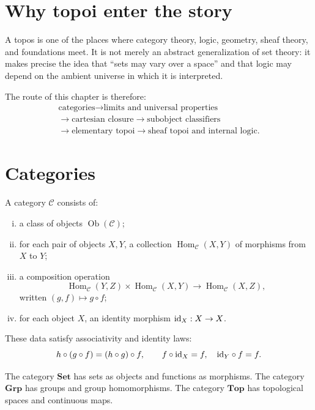
\section{Why topoi enter the story}

A topos is one of the places where category theory, logic, geometry, sheaf theory, and foundations meet.  It is not merely an abstract generalization of set theory: it makes precise the idea that ``sets may vary over a space'' and that logic may depend on the ambient universe in which it is interpreted.

The route of this chapter is therefore:
\[
\begin{gathered}
  \text{categories}\to \text{limits and universal properties}\\
  \to \text{cartesian closure}\to \text{subobject classifiers}\\
  \to \text{elementary topoi}\to \text{sheaf topoi and internal logic}.
\end{gathered}
\]

\section{Categories}

\begin{definition}
A category \(\mathcal C\) consists of:
\begin{enumerate}[(i)]
  \item a class of objects \(\operatorname{Ob}(\mathcal C)\);
  \item for each pair of objects \(X,Y\), a collection \(\operatorname{Hom}_{\mathcal C}(X,Y)\) of morphisms from \(X\) to \(Y\);
  \item a composition operation
  \[
    \operatorname{Hom}_{\mathcal C}(Y,Z)\times
    \operatorname{Hom}_{\mathcal C}(X,Y)
    \longrightarrow
    \operatorname{Hom}_{\mathcal C}(X,Z),
  \]
  written \((g,f)\mapsto g\circ f\);
  \item for each object \(X\), an identity morphism \(\mathrm{id}_X:X\to X\).
\end{enumerate}
These data satisfy associativity and identity laws:
\[
  h\circ(g\circ f)=(h\circ g)\circ f,
  \qquad
  f\circ\mathrm{id}_X=f,\quad \mathrm{id}_Y\circ f=f.
\]
\end{definition}

\begin{example}
The category \(\mathbf{Set}\) has sets as objects and functions as morphisms.  The category \(\mathbf{Grp}\) has groups and group homomorphisms.  The category \(\mathbf{Top}\) has topological spaces and continuous maps.
\end{example}

